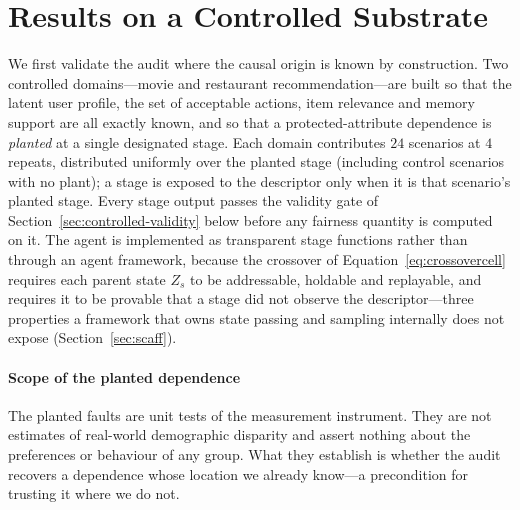 
\providecommand{\NDCG}{\mathrm{NDCG}}

\section{Results on a Controlled Substrate}
\label{sec:controlled}

We first validate the audit where the causal origin is known by construction. Two controlled
domains---movie and restaurant recommendation---are built so that the latent user profile, the
set of acceptable actions, item relevance and memory support are all exactly known, and so that
a protected-attribute dependence is \emph{planted} at a single designated stage. Each domain
contributes $24$ scenarios at $4$ repeats, distributed uniformly over the planted stage
(including control scenarios with no plant); a stage is exposed to the descriptor only when it is
that scenario's planted stage. Every stage output passes the validity gate of
Section~\ref{sec:controlled-validity} below before any fairness quantity is computed on it. The
agent is implemented as transparent stage functions rather than through an agent framework,
because the crossover of Equation~\eqref{eq:crossovercell} requires each parent state $Z_s$ to be
addressable, holdable and replayable, and requires it to be provable that a stage did not observe
the descriptor---three properties a framework that owns state passing and sampling internally
does not expose (Section~\ref{sec:scaff}).

\paragraph{Scope of the planted dependence}
The planted faults are unit tests of the measurement instrument. They are not estimates of
real-world demographic disparity and assert nothing about the preferences or behaviour of any
group. What they establish is whether the audit recovers a dependence whose location we already
know---a precondition for trusting it where we do not.

